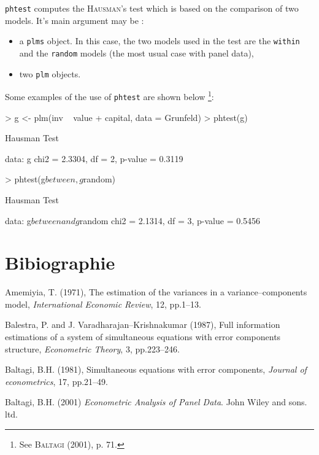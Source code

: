 \documentclass{article}
\begin{document}
\texttt{phtest} computes the \textsc{Hausman}'s test which is based on
the  comparison of two models. It's main argument may be :

\begin{itemize}
\item a \texttt{plms} object. In this case, the two models used in the
  test are the \texttt{within} and the \texttt{random} models (the
  most usual case with panel data),
\item two \texttt{plm} objects.
\end{itemize}


Some examples of the use of \texttt{phtest} are shown below
\footnote{See \textsc{Baltagi} (2001), p. 71.}:


\begin{Schunk}
\begin{Sinput}
> g <- plm(inv ~ value + capital, data = Grunfeld)
> phtest(g)
\end{Sinput}
\begin{Soutput}
	Hausman Test

data:  g 
chi2 = 2.3304, df = 2, p-value = 0.3119
\end{Soutput}
\begin{Sinput}
> phtest(g$between, g$random)
\end{Sinput}
\begin{Soutput}
	Hausman Test

data:  g$between and g$random 
chi2 = 2.1314, df = 3, p-value = 0.5456
\end{Soutput}
\end{Schunk}


\section{Bibiographie}

\setlength{\parindent}{0em}
\setlength{\parskip}{0.4cm}

  Amemiyia, T. (1971), The estimation of the variances in a
  variance--components model, \emph{International Economic Review}, 12,
  pp.1--13.

  Balestra, P. and J. Varadharajan--Krishnakumar (1987), Full
  information estimations of a system of simultaneous equations with
  error components structure, \emph{Econometric Theory}, 3, pp.223--246.
  
  Baltagi, B.H. (1981), Simultaneous equations with error components,
  \emph{Journal of econometrics}, 17, pp.21--49.
  
  Baltagi, B.H. (2001) \emph{Econometric Analysis of Panel Data}. John
  Wiley and sons. ltd.
\end{document}
